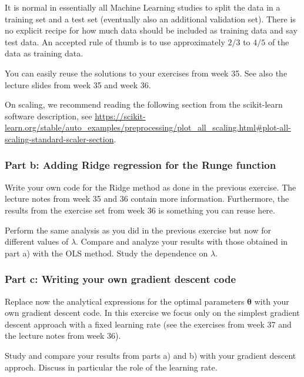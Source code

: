 \documentclass[11pt]{article}
\begin{document}
It is normal in essentially all Machine Learning studies to split the
data in a training set and a test set (eventually also an additional
validation set). There is no explicit recipe for how much data should be
included as training data and say test data. An accepted rule of thumb
is to use approximately \(2/3\) to \(4/5\) of the data as training data.

You can easily reuse the solutions to your exercises from week 35. See
also the lecture slides from week 35 and week 36.

On scaling, we recommend reading the following section from the
scikit-learn software description, see
\url{https://scikit-learn.org/stable/auto_examples/preprocessing/plot_all_scaling.html\#plot-all-scaling-standard-scaler-section}.

    \hypertarget{part-b-adding-ridge-regression-for-the-runge-function}{%
\subsubsection*{Part b: Adding Ridge regression for the Runge
function}\label{part-b-adding-ridge-regression-for-the-runge-function}}

Write your own code for the Ridge method as done in the previous
exercise. The lecture notes from week 35 and 36 contain more
information. Furthermore, the results from the exercise set from week 36
is something you can reuse here.

Perform the same analysis as you did in the previous exercise but now
for different values of \(\lambda\). Compare and analyze your results
with those obtained in part a) with the OLS method. Study the dependence
on \(\lambda\).

    \hypertarget{part-c-writing-your-own-gradient-descent-code}{%
\subsubsection*{Part c: Writing your own gradient descent
code}\label{part-c-writing-your-own-gradient-descent-code}}

Replace now the analytical expressions for the optimal parameters
\(\boldsymbol{\theta}\) with your own gradient descent code. In this
exercise we focus only on the simplest gradient descent approach with a
fixed learning rate (see the exercises from week 37 and the lecture
notes from week 36).

Study and compare your results from parts a) and b) with your gradient
descent approch. Discuss in particular the role of the learning rate.
\end{document}
